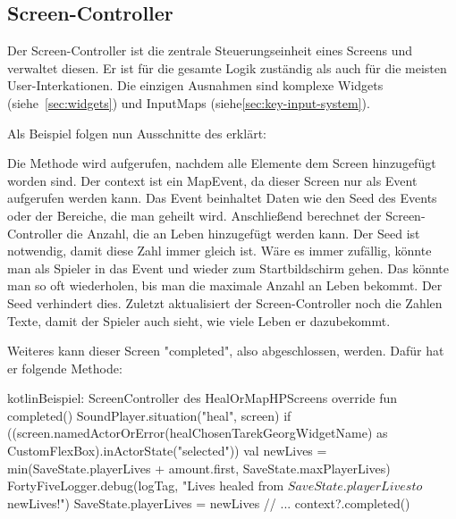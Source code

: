 \renewcommand{\kapitelautor}{Autor: Felix Zwickelstorfer}
\subsection{Screen-Controller}\label{subsec:screen-controller}
\renewcommand{\kapitelautor}{Autor: Felix Zwickelstorfer}
Der Screen-Controller ist die zentrale Steuerungseinheit eines Screens und verwaltet diesen.
Er ist für die gesamte Logik zuständig als auch für die meisten User-Interkationen.
Die einzigen Ausnahmen sind komplexe Widgets (siehe~\ref{sec:widgets}) und InputMaps (siehe\ref{sec:key-input-system}).

Als Beispiel folgen nun Ausschnitte des  erklärt:


Die  Methode wird aufgerufen, nachdem alle Elemente dem Screen hinzugefügt worden sind.
Der context ist ein MapEvent, da dieser Screen nur als Event aufgerufen werden kann.
Das Event beinhaltet Daten wie den Seed des Events oder der Bereiche, die man geheilt wird.
Anschließend berechnet der Screen-Controller die Anzahl, die an Leben hinzugefügt werden kann.
Der Seed ist notwendig, damit diese Zahl immer gleich ist.
Wäre es immer zufällig, könnte man als Spieler in das Event und wieder zum Startbildschirm gehen.
Das könnte man so oft wiederholen, bis man die maximale Anzahl an Leben bekommt.
Der Seed verhindert dies.
Zuletzt aktualisiert der Screen-Controller noch die Zahlen Texte, damit der Spieler auch sieht, wie viele Leben er dazubekommt.

Weiteres kann dieser Screen "completed", also abgeschlossen, werden.
Dafür hat er folgende Methode:
\begin{codeBlock}{kotlin}{Beispiel: Screen\-Controller des HealOrMapHP\-Screens}
    override fun completed() {
        SoundPlayer.situation("heal", screen)
        if ((screen.namedActorOrError(healChosenTarekGeorgWidgetName) as CustomFlexBox).inActorState("selected")) {
            val newLives = min(SaveState.playerLives + amount.first, SaveState.maxPlayerLives)
            FortyFiveLogger.debug(logTag, "Lives healed from ${SaveState.playerLives} to $newLives!")
            SaveState.playerLives = newLives
        }
        // ...
        context?.completed()
    }
\end{codeBlock}

